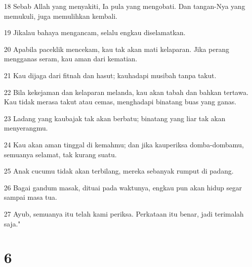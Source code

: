 \par 18 Sebab Allah yang menyakiti, Ia pula yang mengobati. Dan tangan-Nya yang memukuli, juga memulihkan kembali.
\par 19 Jikalau bahaya mengancam, selalu engkau diselamatkan.
\par 20 Apabila paceklik mencekam, kau tak akan mati kelaparan. Jika perang mengganas seram, kau aman dari kematian.
\par 21 Kau dijaga dari fitnah dan hasut; kauhadapi musibah tanpa takut.
\par 22 Bila kekejaman dan kelaparan melanda, kau akan tabah dan bahkan tertawa. Kau tidak merasa takut atau cemas, menghadapi binatang buas yang ganas.
\par 23 Ladang yang kaubajak tak akan berbatu; binatang yang liar tak akan menyerangmu.
\par 24 Kau akan aman tinggal di kemahmu; dan jika kauperiksa domba-dombamu, semuanya selamat, tak kurang suatu.
\par 25 Anak cucumu tidak akan terbilang, mereka sebanyak rumput di padang.
\par 26 Bagai gandum masak, dituai pada waktunya, engkau pun akan hidup segar sampai masa tua.
\par 27 Ayub, semuanya itu telah kami periksa. Perkataan itu benar, jadi terimalah saja."

\chapter{6}


